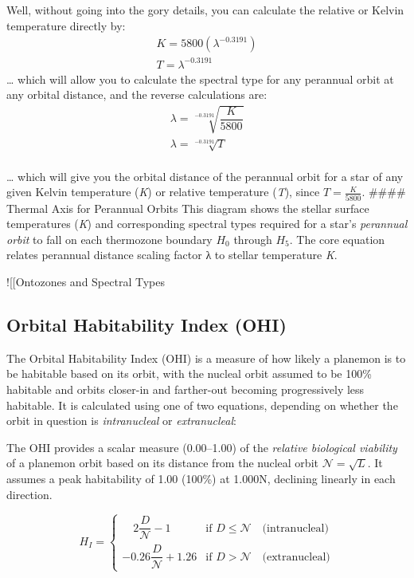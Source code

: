 \documentclass[
  letterpaper,
]{book}
\begin{document}
Well, without going into the gory details, you can calculate the
relative or Kelvin temperature directly by: \[\begin{gather}
K =5800(\lambda^{-0.3191}) \\[1em]
T = \lambda^{-0.3191}
\end{gather}
\] \ldots{} which will allow you to calculate the spectral type for any
perannual orbit at any orbital distance, and the reverse calculations
are: \[
\begin{gather}
\lambda = \sqrt[-0.3191]{\dfrac{K}{5800}} \\[1em]
\lambda = \sqrt[-0.3191]{T}
\end{gather}
\]\\
\ldots{} which will give you the orbital distance of the perannual orbit
for a star of any given Kelvin temperature (\emph{K}) or relative
temperature (\emph{T}), since \(T=\frac{K}{5800}\). \#\#\#\# Thermal
Axis for Perannual Orbits This diagram shows the stellar surface
temperatures (\emph{K}) and corresponding spectral types required for a
star's \emph{perannual orbit} to fall on each thermozone boundary
\(H_0\)\hspace{0pt} through \(H_5\)\hspace{0pt}. The core equation
relates perannual distance scaling factor λ to stellar temperature
\emph{K}.

!{[}{[}Ontozones and Spectral Types\textbar650{]}{]}

\subsection{Orbital Habitability Index
(OHI)}\label{orbital-habitability-index-ohi}

The Orbital Habitability Index (OHI) is a measure of how likely a
planemon is to be habitable based on its orbit, with the nucleal orbit
assumed to be 100\% habitable and orbits closer-in and farther-out
becoming progressively less habitable. It is calculated using one of two
equations, depending on whether the orbit in question is
\emph{intranucleal} or \emph{extranucleal}:

The OHI provides a scalar measure (0.00--1.00) of the \emph{relative
biological viability} of a planemon orbit based on its distance from the
nucleal orbit \(\mathcal{N} = \sqrt{L}\)\hspace{0pt}. It assumes a peak
habitability of 1.00 (100\%) at 1.000N, declining linearly in each
direction.

\[
H_I =
\begin{cases}
  \quad 2\dfrac{D}{\mathcal{N}} - 1 & \text{if } {D} \leq {\mathcal{N}} \quad \text{(intranucleal)} \\[1em]
  -0.26\dfrac{D}{\mathcal{N}} + 1.26 & \text{if } {D} \gt {\mathcal{N}} \quad \text{(extranucleal)}
\end{cases}
\]
\end{document}
